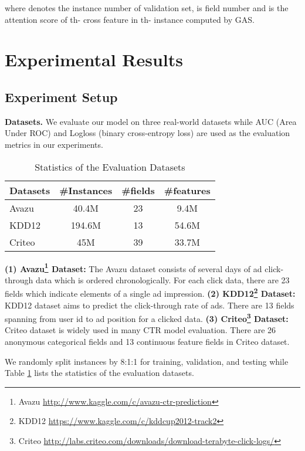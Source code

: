 \documentclass[sigconf,authorversion]{acmart}
\begin{document}
where  denotes the instance number of validation set,  is field number and  is the attention score of th- cross feature in th- instance computed by GAS.


\section{Experimental Results}

\subsection{Experiment Setup}

\textbf{Datasets.}
We evaluate our model on three real-world datasets while AUC (Area Under ROC) and Logloss (binary cross-entropy loss) are used as the evaluation metrics in our experiments.

\begin{table}[h]
\centering
\caption{Statistics of the Evaluation Datasets}
\begin{tabular}{lccc}
\toprule
Datasets  & \#Instances & \#fields & \#features \\
\midrule
Avazu       & 40.4M  & 23 & 9.4M     \\
KDD12     & 194.6M  & 13 & 54.6M \\
Criteo       & 45M  & 39 & 33.7M     \\
\bottomrule
\end{tabular}
\label{tab:datasets}
\end{table}

\textbf{(1) Avazu\footnote{Avazu \url{http://www.kaggle.com/c/avazu-ctr-prediction}} Dataset:} The Avazu dataset consists of several days of ad click- through data which is ordered chronologically. For each click data, there are 23 fields which indicate elements of a single ad impression.
\textbf{(2) KDD12\footnote{KDD12 \url{https://www.kaggle.com/c/kddcup2012-track2}} Dataset:} KDD12 dataset aims to predict the click-through rate of ads. There are 13 fields spanning from user id to ad position for a clicked data.
\textbf{(3) Criteo\footnote{Criteo \url{http://labs.criteo.com/downloads/download-terabyte-click-logs/}} Dataset:} Criteo dataset is widely used in many CTR model evaluation. There are 26 anonymous categorical fields and 13 continuous feature fields in Criteo dataset.

We randomly split instances by 8:1:1 for training, validation, and testing while Table \ref{tab:datasets} lists the statistics of the evaluation datasets. 
\end{document}
